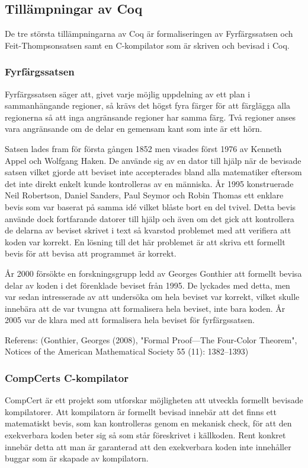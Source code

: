 \subsection{Tillämpningar av Coq}
De tre största tillämpningarna av Coq är formaliseringen av Fyrfärgssatsen och
Feit-Thompsonsatsen samt en C-kompilator som är skriven och bevisad i Coq.

\subsubsection{Fyrfärgssatsen}
Fyrfärgssatsen säger att, givet varje möjlig uppdelning av ett plan i
sammanhängande regioner, så krävs det högst fyra färger för att färglägga alla
regionerna så att inga angränsande regioner har samma färg. Två regioner anses
vara angränsande om de delar en gemensam kant som inte är ett hörn.

Satsen lades fram för första gången 1852 men visades först 1976 av Kenneth
Appel och Wolfgang Haken. De använde sig av en dator till hjälp när de bevisade
satsen vilket gjorde att beviset inte accepterades bland alla matematiker
eftersom det inte direkt enkelt kunde kontrolleras av en människa. År 1995
konstruerade Neil Robertson, Daniel Sanders, Paul Seymor och Robin Thomas ett
enklare bevis som var baserat på samma idé vilket blåste bort en del tvivel.
Detta bevis använde dock fortfarande datorer till hjälp och även om det gick
att kontrollera de delarna av beviset skrivet i text så kvarstod problemet med
att verifiera att koden var korrekt. En lösning till det här problemet är att
skriva ett formellt bevis för att bevisa att programmet är korrekt.

År 2000 försökte en forskningsgrupp ledd av Georges Gonthier att formellt
bevisa delar av koden i det förenklade beviset från 1995. De lyckades med
detta, men var sedan intresserade av att undersöka om hela beviset var korrekt,
vilket skulle innebära att de var tvungna att formalisera hela beviset, inte
bara koden. År 2005 var de klara med att formalisera hela beviset för
fyrfärgssatsen.

Referens: (Gonthier, Georges (2008), "Formal Proof—The Four-Color Theorem",
Notices of the American Mathematical Society 55 (11): 1382–1393)

\subsubsection{CompCerts C-kompilator}
CompCert\cite{compcert} är ett projekt som utforskar möjligheten att utveckla
formellt bevisade kompilatorer. Att kompilatorn är formellt bevisad innebär att
det finns ett matematiskt bevis, som kan kontrolleras genom en mekanisk check,
för att den exekverbara koden beter sig så som står föreskrivet i källkoden.
Rent konkret innebär detta att man är garanterad att den exekverbara koden inte
innehåller buggar som är skapade av kompilatorn.

